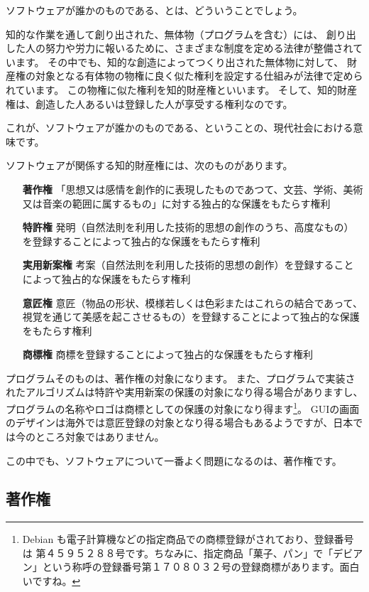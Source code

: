\documentclass[mingoth,a4paper]{jsarticle}
\begin{document}
ソフトウェアが誰かのものである、とは、どういうことでしょう。

知的な作業を通して創り出された、無体物（プログラムを含む）には、
創り出した人の努力や労力に報いるために、さまざまな制度を定める法律が整備されています。
その中でも、知的な創造によってつくり出された無体物に対して、
財産権の対象となる有体物の物権に良く似た権利を設定する仕組みが法律で定められています。
この物権に似た権利を知的財産権といいます。
そして、知的財産権は、創造した人あるいは登録した人が享受する権利なのです。

これが、ソフトウェアが誰かのものである、ということの、現代社会における意味です。

ソフトウェアが関係する知的財産権には、次のものがあります。

\begin{itemize}
\item[{\bf{著作権}}] 「思想又は感情を創作的に表現したものであつて、文芸、学術、美術又は音楽の範囲に属するもの」に対する独占的な保護をもたらす権利
\item[{\bf{特許権}}]  発明（自然法則を利用した技術的思想の創作のうち、高度なもの）を登録することによって独占的な保護をもたらす権利
\item[{\bf{実用新案権}}] 考案（自然法則を利用した技術的思想の創作）を登録することによって独占的な保護をもたらす権利
\item[{\bf{意匠権}}] 意匠（物品の形状、模様若しくは色彩またはこれらの結合であって、視覚を通じて美感を起こさせるもの）を登録することによって独占的な保護をもたらす権利
\item[{\bf{商標権}}] 商標を登録することによって独占的な保護をもたらす権利
\end{itemize}

プログラムそのものは、著作権の対象になります。
また、プログラムで実装されたアルゴリズムは特許や実用新案の保護の対象になり得る場合がありますし、プログラムの名称やロゴは商標としての保護の対象になり得ます\footnote{Debian も電子計算機などの指定商品での商標登録がされており、登録番号は 第４５９５２８８号です。ちなみに、指定商品「菓子、パン」で「デビアン」という称呼の登録番号第１７０８０３２号の登録商標があります。面白いですね。}。
GUIの画面のデザインは海外では意匠登録の対象となり得る場合もあるようですが、日本では今のところ対象ではありません。

この中でも、ソフトウェアについて一番よく問題になるのは、著作権です。

\subsection{著作権}
\end{document}
